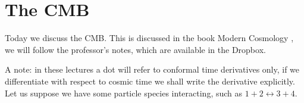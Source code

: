 \documentclass[main.tex]{subfiles}
\begin{document}
\chapter{The CMB}


Today we discuss the CMB. 
This is discussed in the book Modern Cosmology \cite{dodelsonModernCosmology2003}, we will follow the professor's notes, which are available in the Dropbox.

A note: in these lectures a dot will refer to conformal time derivatives only, if we differentiate with respect to cosmic time we shall write the derivative explicitly.
Let us suppose we have some particle species interacting, such as \(1 + 2 \leftrightarrow 3 +4\). 
\end{document}
